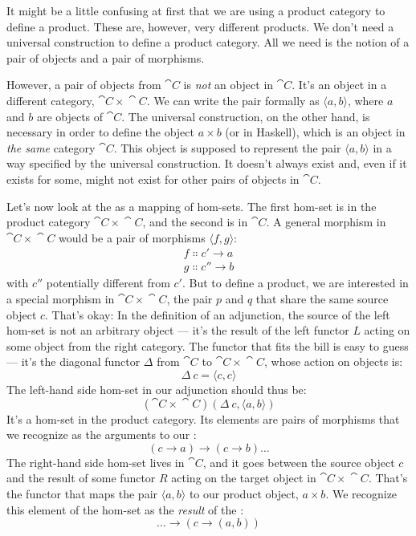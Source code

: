 \noindent
It might be a little confusing at first that we are using a product
category to define a product. These are, however, very different
products. We don't need a universal construction to define a product
category. All we need is the notion of a pair of objects and a pair of
morphisms.

However, a pair of objects from $\cat{C}$ is \emph{not} an object in
$\cat{C}$. It's an object in a different category, $\cat{C}\times{}\cat{C}$. We can
write the pair formally as $\langle a, b \rangle$,
where $a$ and $b$ are objects of $\cat{C}$. The universal
construction, on the other hand, is necessary in order to define the
object $a\times{}b$ (or  in Haskell), which is an object
in \emph{the same} category $\cat{C}$. This object is supposed to
represent the pair $\langle a, b \rangle$ in a way
specified by the universal construction. It doesn't always exist and,
even if it exists for some, might not exist for other pairs of objects
in $\cat{C}$.

Let's now look at the  as a mapping of hom-sets. The
first hom-set is in the product category $\cat{C}\times{}\cat{C}$, and the second is
in $\cat{C}$. A general morphism in $\cat{C}\times{}\cat{C}$ would be a pair of
morphisms $\langle f, g \rangle$:
\begin{gather*}
  f \Colon c' \to a \\
  g \Colon c'' \to b
\end{gather*}
with $c''$ potentially different from
$c'$. But to define a product, we are interested in a
special morphism in $\cat{C}\times{}\cat{C}$, the pair $p$ and $q$ that
share the same source object $c$. That's okay: In the definition
of an adjunction, the source of the left hom-set is not an arbitrary
object --- it's the result of the left functor $L$ acting on some
object from the right category. The functor that fits the bill is easy
to guess --- it's the diagonal functor $\Delta$ from $\cat{C}$ to $\cat{C}\times{}\cat{C}$,
whose action on objects is:
\[\Delta\ c = \langle c, c \rangle\]
The left-hand side hom-set in our adjunction should thus be:
\[(\cat{C}\times{}\cat{C})(\Delta\ c, \langle a, b \rangle)\]
It's a hom-set in the product category. Its elements are pairs of
morphisms that we recognize as the arguments to our :
\[(c \to a) \to (c \to b) \ldots{}\]
The right-hand side hom-set lives in $\cat{C}$, and it goes between the
source object $c$ and the result of some functor $R$
acting on the target object in $\cat{C}\times{}\cat{C}$. That's the functor that maps
the pair $\langle a, b \rangle$ to our product object,
$a\times{}b$. We recognize this element of the hom-set as the
\emph{result} of the :
\[\ldots{} \to (c \to (a, b))\]

